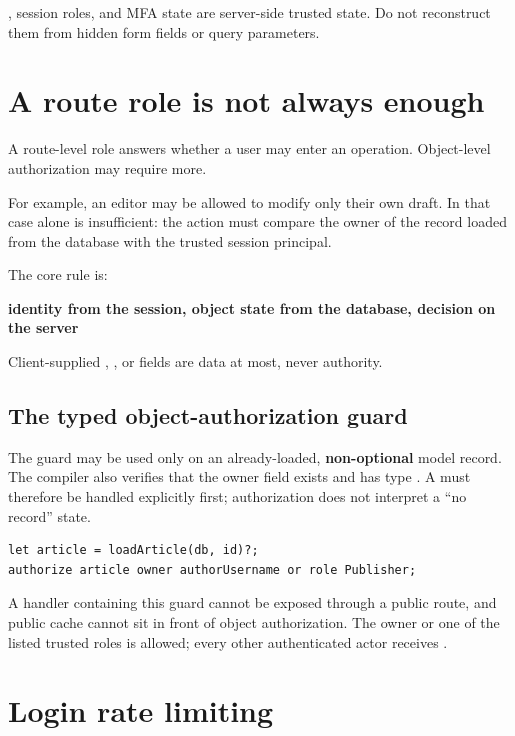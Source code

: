 , session roles, and MFA state are server-side trusted state. Do not reconstruct them from hidden form fields or query parameters.

\section{A route role is not always enough}

A route-level role answers whether a user may enter an operation. Object-level authorization may require more.

For example, an editor may be allowed to modify only their own draft. In that case  alone is insufficient: the action must compare the owner of the record loaded from the database with the trusted session principal.

The core rule is:

\begin{center}
\textbf{identity from the session, object state from the database, decision on the server}
\end{center}

Client-supplied , , or  fields are data at most, never authority.

\subsection*{The typed object-authorization guard}

The  guard may be used only on an already-loaded, \textbf{non-optional} model record. The compiler also verifies that the owner field exists and has type . A  must therefore be handled explicitly first; authorization does not interpret a ``no record'' state.

\begin{lstlisting}[language=RWLang]
let article = loadArticle(db, id)?;
authorize article owner authorUsername or role Publisher;
\end{lstlisting}

A handler containing this guard cannot be exposed through a public route, and public cache cannot sit in front of object authorization. The owner or one of the listed trusted roles is allowed; every other authenticated actor receives .

\section{Login rate limiting}

